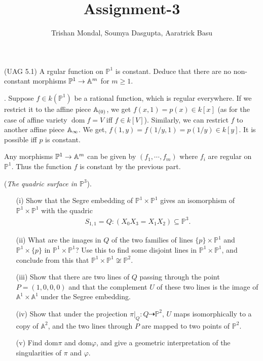 \documentclass[12pt]{article}
\title{Assignment-3}
\author{Trishan Mondal, Soumya Dasgupta, Aaratrick Basu}
\date{}
\begin{document}
\maketitle
\setcounter{section}{3}

\begin{prob} %
    (UAG 5.1) A rgular function on $\mathbb{P}^1$ is constant. Deduce that there are no non-constant morphisms $\mathbb{P}^1 \to \mathbb{A}^m$ for $m \geq 1$.
\end{prob}

\sol. Suppose  $f \in k(\mathbb{P}^1)$ be a rational function, which is regular everywhere. If we restrict it to the affine piece $\mathbb{A}_{(0)}$, we get $f(x,1) = p(x) \in k[x]$ (as for the case of affine variety $\operatorname{dom} f = V$ iff $f \in k[V]$). Similarly, we can restrict $f$ to another affine piece $\mathbb{A}_{\infty}$. We get, $f(1,y) = f(1/y,1) = p(1/y) \in k[y]$. It is possible iff $p$ is constant.

\vspace*{0.2cm}

\noindent Any morphisms  $\mathbb{P}^1 \to \mathbb{A}^m$ can be given by $(f_1,\cdots,f_m)$ where $f_i$ are regular on $\mathbb{P}^1$. Thus the function $f$ is constant by the previous part. \Qed

\begin{prob}
    (\textit{The quadric surface in $\mathbb{P}^3$}).
    \begin{enumerate}
        \item[(i)] Show that the Segre embedding of $\mathbb{P}^1 \times \mathbb{P}^1$ gives an isomorphism of $\mathbb{P}^1 \times \mathbb{P}^1$ with the quadric
            \begin{align*}
                S_{1,1} = Q : (X_0X_3 = X_1X_2) \subseteq \mathbb{P}^3.
            \end{align*}
        \item[(ii)] What are the images in $Q$ of the two families of lines $\{p\} \times \mathbb{P}^1$ and $\mathbb{P}^1 \times \{p\}$ in $\mathbb{P}^1 \times \mathbb{P}^1$? Use this to find some disjoint lines in $\mathbb{P}^1 \times \mathbb{P}^1$, and conclude from this that $\mathbb{P}^1 \times \mathbb{P}^1 \not\cong \mathbb{P}^2$.
        \item[(iii)] Show that there are two lines of $Q$ passing through the point $P = (1,0,0,0)$ and that the complement $U$ of these two lines is the image of $\mathbb{A}^1 \times \mathbb{A}^1$ under the Segree embedding.
        \item[(iv)] Show that under the projection $\pi\vert_{Q} : Q \dashrightarrow \mathbb{P}^2$, $U$ maps isomorphically to a copy of $\mathbb{A}^2$, and the two lines through $P$ are mapped to two points of $\mathbb{P}^2$.
        \item[(v)] Find $\mathrm{dom} \pi$ and $\mathrm{dom} \varphi$, and give a geometric interpretation of the singularities of $\pi$ and $\varphi$.
    \end{enumerate}
\end{prob}
\end{document}

